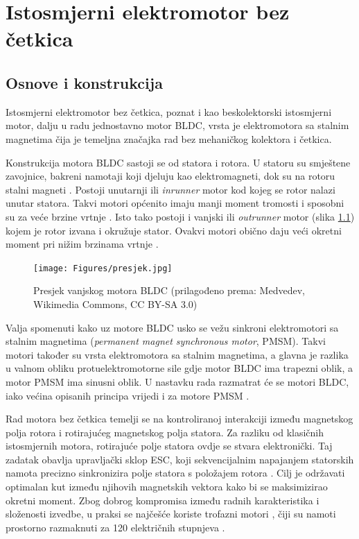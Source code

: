 \documentclass[diplomskirad]{fer}
\begin{document}
\chapter{Istosmjerni elektromotor bez četkica}
\label{pog:bldc}
\section{Osnove i konstrukcija}
\label{sec:bldc:uvod}

Istosmjerni elektromotor bez četkica, poznat i kao beskolektorski istosmjerni
motor, dalju u radu jednostavno motor BLDC, vrsta je elektromotora sa stalnim
magnetima čija je temeljna značajka rad bez mehaničkog kolektora i četkica.

Konstrukcija motora BLDC sastoji se od statora i rotora. U statoru su smještene
zavojnice, bakreni namotaji koji djeluju kao elektromagneti, dok su na rotoru
stalni magneti \cite{elektromotor-beskolektorski}. Postoji unutarnji ili
\textit{inrunner} motor kod kojeg se rotor nalazi unutar statora. Takvi motori
općenito imaju manji moment tromosti i sposobni su za veće brzine vrtnje
\cite{cite:bldc}. Isto tako postoji i vanjski ili \textit{outrunner} motor
(slika \ref{fig:presjek_motora}) kojem je rotor izvana i okružuje stator.
Ovakvi motori obično daju veći okretni moment pri nižim brzinama vrtnje
\cite{cite:bldc}.

\begin{figure}[h!]
	\centering
	\texttt{[image: Figures/presjek.jpg]}
	\caption{Presjek vanjskog motora BLDC (prilagođeno prema: Medvedev, Wikimedia Commons, CC BY-SA 3.0)}
	\label{fig:presjek_motora}
\end{figure}

Valja spomenuti kako uz motore BLDC usko se vežu sinkroni elektromotori sa
stalnim magnetima (\textit{permanent magnet synchronous motor}, PMSM). Takvi
motori također su vrsta elektromotora sa stalnim magnetima, a glavna je razlika
u valnom obliku protuelektromotorne sile gdje motor BLDC ima trapezni oblik, a
motor PMSM ima sinusni oblik. U nastavku rada razmatrat će se motori BLDC, iako
većina opisanih principa vrijedi i za motore PMSM
\cite{elektromotor-sa-stalnim-magnetima}.

Rad motora bez četkica temelji se na kontroliranoj interakciji između
magnetskog polja rotora i rotirajućeg magnetskog polja statora. Za razliku od
klasičnih istosmjernih motora, rotirajuće polje statora ovdje se stvara
elektronički. Taj zadatak obavlja upravljački sklop ESC, koji sekvencijalnim
napajanjem statorskih namota precizno sinkronizira polje statora s položajem
rotora \cite{cite:disertacija}. Cilj je održavati optimalan kut između njihovih
magnetskih vektora kako bi se maksimizirao okretni moment. Zbog dobrog
kompromisa između radnih karakteristika i složenosti izvedbe, u praksi se
najčešće koriste trofazni motori \cite{cite:trofazni}, čiji su namoti prostorno
razmaknuti za 120 električnih stupnjeva \cite{MicrochipAN885}.
\end{document}
